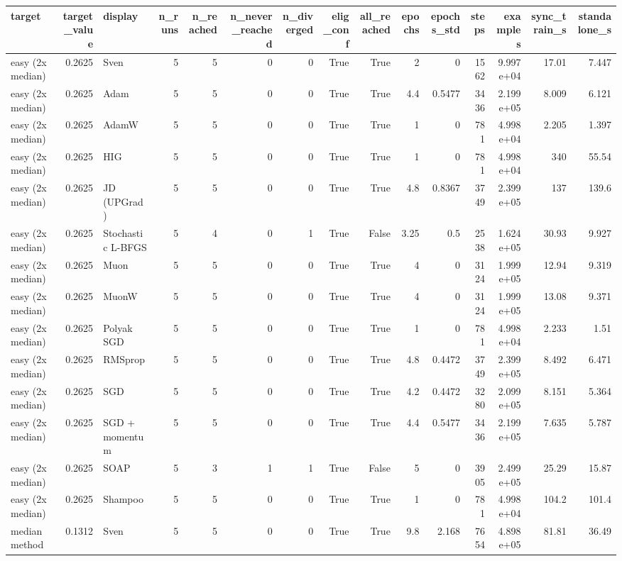 \begin{tabular}{lrlrrrrrrrrrrrr}
\toprule
target & target\_value & display & n\_runs & n\_reached & n\_never\_reached & n\_diverged & elig\_conf & all\_reached & epochs & epochs\_std & steps & examples & sync\_train\_s & standalone\_s \\
\midrule
easy (2x median) & 0.2625 & Sven & 5 & 5 & 0 & 0 & True & True & 2 & 0 & 1562 & 9.997e+04 & 17.01 & 7.447 \\
easy (2x median) & 0.2625 & Adam & 5 & 5 & 0 & 0 & True & True & 4.4 & 0.5477 & 3436 & 2.199e+05 & 8.009 & 6.121 \\
easy (2x median) & 0.2625 & AdamW & 5 & 5 & 0 & 0 & True & True & 1 & 0 & 781 & 4.998e+04 & 2.205 & 1.397 \\
easy (2x median) & 0.2625 & HIG & 5 & 5 & 0 & 0 & True & True & 1 & 0 & 781 & 4.998e+04 & 340 & 55.54 \\
easy (2x median) & 0.2625 & JD (UPGrad) & 5 & 5 & 0 & 0 & True & True & 4.8 & 0.8367 & 3749 & 2.399e+05 & 137 & 139.6 \\
easy (2x median) & 0.2625 & Stochastic L-BFGS & 5 & 4 & 0 & 1 & True & False & 3.25 & 0.5 & 2538 & 1.624e+05 & 30.93 & 9.927 \\
easy (2x median) & 0.2625 & Muon & 5 & 5 & 0 & 0 & True & True & 4 & 0 & 3124 & 1.999e+05 & 12.94 & 9.319 \\
easy (2x median) & 0.2625 & MuonW & 5 & 5 & 0 & 0 & True & True & 4 & 0 & 3124 & 1.999e+05 & 13.08 & 9.371 \\
easy (2x median) & 0.2625 & Polyak SGD & 5 & 5 & 0 & 0 & True & True & 1 & 0 & 781 & 4.998e+04 & 2.233 & 1.51 \\
easy (2x median) & 0.2625 & RMSprop & 5 & 5 & 0 & 0 & True & True & 4.8 & 0.4472 & 3749 & 2.399e+05 & 8.492 & 6.471 \\
easy (2x median) & 0.2625 & SGD & 5 & 5 & 0 & 0 & True & True & 4.2 & 0.4472 & 3280 & 2.099e+05 & 8.151 & 5.364 \\
easy (2x median) & 0.2625 & SGD + momentum & 5 & 5 & 0 & 0 & True & True & 4.4 & 0.5477 & 3436 & 2.199e+05 & 7.635 & 5.787 \\
easy (2x median) & 0.2625 & SOAP & 5 & 3 & 1 & 1 & True & False & 5 & 0 & 3905 & 2.499e+05 & 25.29 & 15.87 \\
easy (2x median) & 0.2625 & Shampoo & 5 & 5 & 0 & 0 & True & True & 1 & 0 & 781 & 4.998e+04 & 104.2 & 101.4 \\
median method & 0.1312 & Sven & 5 & 5 & 0 & 0 & True & True & 9.8 & 2.168 & 7654 & 4.898e+05 & 81.81 & 36.49 \\

\end{tabular}
